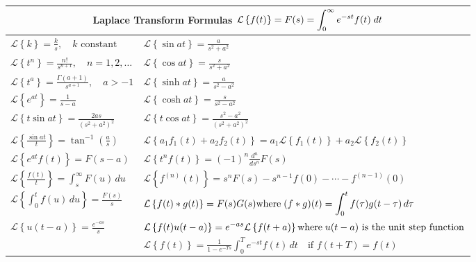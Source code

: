 \documentclass{article}
\newcommand{\laplace}[1]{\mathcal{L}\left\{#1\right\}}
\begin{document}
    \begin{center}
    \renewcommand{\arraystretch}{3.5}
        \begin{tabular}{|p{}|p{}|}
            \hline
            \multicolumn{2}{|c|}{\textbf{Laplace Transform Formulas} $\displaystyle\newline{\laplace{f(t)} = F(s) = \int_0^\infty e^{-st} f(t) \; dt}$} \\
            \hline
            $\displaystyle\laplace{k} = \frac{k}{s},\quad k \text{ constant}$ & $\displaystyle\laplace{\sin at} = \frac{a}{s^2 + a^2} $ \\
            $\displaystyle\laplace{t^n} = \frac{n!}{s^{n+1}},\quad n=1,2,\dots$ & $\displaystyle\laplace{\cos at} = \frac{s}{s^2 + a^2} $ \\
            $\displaystyle\laplace{t^a} = \frac{\Gamma(a+1)}{s^{a+1}},\quad a > -1 $ & $\displaystyle\laplace{\sinh at} = \frac{a}{s^2 - a^2} $ \\
            $\displaystyle\laplace{e^{at}} = \frac{1}{s - a} $ & $\displaystyle\laplace{\cosh at} = \frac{s}{s^2 - a^2} $ \\
            $\displaystyle\laplace{t \sin at} = \frac{2as}{(s^2 + a^2)^2} $ & $\displaystyle\laplace{t \cos at} = \frac{s^2 - a^2}{(s^2 + a^2)^2} $ \\
            $\displaystyle\laplace{\frac{\sin at}{t}} = \tan^{-1}\left(\frac{a}{s}\right)$ & $\displaystyle\laplace{a_1 f_1(t) + a_2 f_2(t)} = a_1 \laplace{f_1(t)} + a_2 \laplace{f_2(t)}$ \\
            $\displaystyle\laplace{e^{at} f(t)} = F(s - a)$ & $\displaystyle\laplace{t^n f(t)} = (-1)^n \frac{d^n}{ds^n}F(s)$ \\
            $\displaystyle\laplace{\frac{f(t)}{t}} = \int_s^\infty F(u)\,du$ & $\displaystyle\laplace{f^{(n)}(t)} = s^nF(s) - s^{n-1}f(0) - \cdots - f^{(n-1)}(0)$ \\
            $\displaystyle\laplace{\int_0^t f(u)\,du} = \frac{F(s)}{s}$ & $\displaystyle\laplace{f(t) * g(t)} = F(s)G(s) \newline{\text{where} \; (f * g)(t) = \int_0^t f(\tau) g(t - \tau)\,d\tau}$ \\
            $\displaystyle\laplace{u(t - a)} = \frac{e^{-as}}{s}$ & $\displaystyle\laplace{f(t)u(t - a)} = e^{-as} \laplace{f(t + a)} \newline{\text{where} \; u(t - a) \text{ is the unit step function}}$ \\
            & $\displaystyle\laplace{f(t)} = \frac{1}{1 - e^{-Ts}} \int_0^T e^{-st} f(t)\,dt \quad \text{if } f(t + T) = f(t)$ \\         
            \hline
        \end{tabular}
    \end{center}
\end{document}
